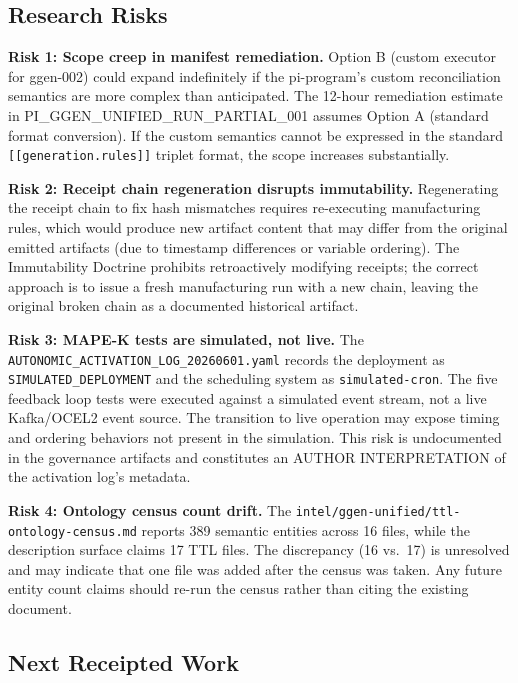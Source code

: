 \subsection{Research Risks}
\label{sec:research-pi-program-openq-risks}

\textbf{Risk 1: Scope creep in manifest remediation.} Option B (custom executor for ggen-002) could expand indefinitely if the pi-program's custom reconciliation semantics are more complex than anticipated. The 12-hour remediation estimate in PI\_GGEN\_UNIFIED\_RUN\_PARTIAL\_001 assumes Option A (standard format conversion). If the custom semantics cannot be expressed in the standard \texttt{[[generation.rules]]} triplet format, the scope increases substantially.

\textbf{Risk 2: Receipt chain regeneration disrupts immutability.} Regenerating the receipt chain to fix hash mismatches requires re-executing manufacturing rules, which would produce new artifact content that may differ from the original emitted artifacts (due to timestamp differences or variable ordering). The Immutability Doctrine prohibits retroactively modifying receipts; the correct approach is to issue a fresh manufacturing run with a new chain, leaving the original broken chain as a documented historical artifact.

\textbf{Risk 3: MAPE-K tests are simulated, not live.} The \texttt{AUTONOMIC\_ACTIVATION\_LOG\_20260601.yaml} records the deployment as \texttt{SIMULATED\_DEPLOYMENT} and the scheduling system as \texttt{simulated-cron}. The five feedback loop tests were executed against a simulated event stream, not a live Kafka/OCEL2 event source. The transition to live operation may expose timing and ordering behaviors not present in the simulation. This risk is undocumented in the governance artifacts and constitutes an AUTHOR INTERPRETATION of the activation log's metadata.

\textbf{Risk 4: Ontology census count drift.} The \texttt{intel/ggen-unified/ttl-ontology-census.md} reports 389 semantic entities across 16 files, while the description surface claims 17 TTL files. The discrepancy (16 vs.~17) is unresolved and may indicate that one file was added after the census was taken. Any future entity count claims should re-run the census rather than citing the existing document.

\subsection{Next Receipted Work}
\label{sec:research-pi-program-openq-next}

